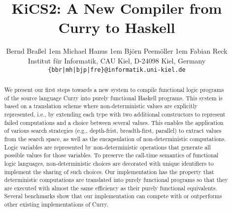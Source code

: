 \documentclass{scrartcl}
\begin{document}
\title{KiCS2: A New Compiler from Curry to Haskell}

\author{
Bernd Bra\ss{}el
\kern1em
Michael Hanus
\kern1em
 Bj{\"o}rn Peem{\"o}ller
\kern1em
Fabian Reck \\
Institut f{\"u}r Informatik, CAU Kiel, D-24098 Kiel, Germany \\
\texttt{\{bbr|mh|bjp|fre\}@informatik.uni-kiel.de}}
\date{}
\maketitle
\thispagestyle{empty}

\begin{abstract}
We present our first steps towards a new system to compile functional logic
programs of the source language Curry into purely functional Haskell programs.
This system is based on a translation scheme where non-deterministic values
are explicitly represented, i.e., by extending each type with two additional
constructors to represent failed computations and
a choice between several values.
This enables the application of various search
strategies (e.g., depth-frist, breadth-first, parallel) to extract values from
the search space, as well as the encapsulation of non-deterministic
computations.
Logic variables are represented by non-deterministic
operations that generate all possible values for those variables.
To preserve the call-time semantics of functional logic languages,
non-deterministic choices are decorated with unique identifiers
to implement the sharing of such choices.
Our implementation has the property that
deterministic computations are translated into purely
functional programs so that they are executed with almost the same efficiency as
their purely functional equivalents. Several benchmarks show that our
implementation can compete with or outperforms other existing implementations
of Curry.
\end{abstract}
\end{document}
